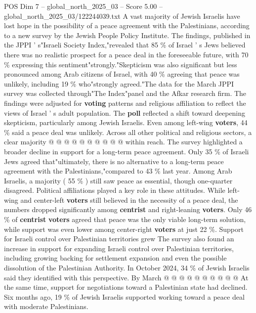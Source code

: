 \begin{textsample}{POS Dim 7 – global\_north\_2025\_03 – Score 5.00 – global\_north\_2025\_03/122244039.txt}  \label{ex:f7_pos_323}
A vast majority of Jewish Israelis have lost hope in the possibility of a peace agreement with the Palestinians, according to a new survey by the Jewish People Policy Institute.
The findings, published in the JPPI ' s"Israeli Society Index,"revealed that 85 \% of Israel ' s Jews believed there was no realistic prospect for a peace deal in the foreseeable future, with 70 \% expressing this sentiment"strongly."Skepticism was also significant but less pronounced among Arab citizens of Israel, with 40 \% agreeing that peace was unlikely, including 19 \% who"strongly agreed."The data for the March JPPI survey was collected through"The Index"panel and the Afkar research firm.
The findings were adjusted for \textbf{voting} patterns and religious affiliation to reflect the views of Israel ' s adult population.
The \textbf{poll} reflected a shift toward deepening skepticism, particularly among Jewish Israelis.
Even among left-wing \textbf{voters}, 44 \% said a peace deal was unlikely.
Across all other political and religious sectors, a clear majority @ @ @ @ @ @ @ @ @ @ within reach.
The survey highlighted a broader decline in support for a long-term peace agreement.
Only 35 \% of Israeli Jews agreed that"ultimately, there is no alternative to a long-term peace agreement with the Palestinians,"compared to 43 \% last year.
Among Arab Israelis, a majority ( 55 \% ) still saw peace as essential, though one-quarter disagreed.
Political affiliations played a key role in these attitudes.
While left-wing and center-left \textbf{voters} still believed in the necessity of a peace deal, the numbers dropped significantly among \textbf{centrist} and right-leaning \textbf{voters}.
Only 46 \% of \textbf{centrist} \textbf{voters} agreed that peace was the only viable long-term solution, while support was even lower among center-right \textbf{voters} at just 22 \%.
Support for Israeli control over Palestinian territories grew The survey also found an increase in support for expanding Israeli control over Palestinian territories, including growing backing for settlement expansion and even the possible dissolution of the Palestinian Authority.
In October 2024, 34 \% of Jewish Israelis said they identified with this perspective.
By March @ @ @ @ @ @ @ @ @ @ At the same time, support for negotiations toward a Palestinian state had declined.
Six months ago, 19 \% of Jewish Israelis supported working toward a peace deal with moderate Palestinians.

\end{textsample}
